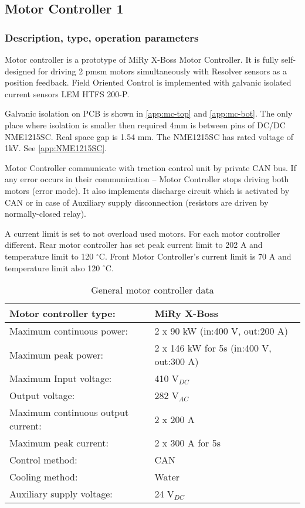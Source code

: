 \subsection{Motor Controller 1}

\subsubsection{Description, type, operation parameters}
Motor controller is a prototype of MiRy X-Boss Motor Controller. It is fully self-designed for driving 2 \gls{pmsm} motors simultaneously with Resolver sensors as a position feedback. Field Oriented Control is implemented with galvanic isolated current sensors LEM HTFS 200-P.

Galvanic isolation on PCB is shown in \ref{app:mc-top} and \ref{app:mc-bot}. The only place where isolation is smaller then required 4mm is between pins of DC/DC NME1215SC. Real space gap is 1.54 mm. The NME1215SC has rated voltage of 1kV. See \ref{app:NME1215SC}.

Motor Controller communicate with traction control unit by private CAN bus. If any error occurs in their communication – Motor Controller stops driving both motors (error mode). It also implements discharge circuit which is activated by CAN or in case of Auxiliary supply disconnection (resistors are driven by normally-closed relay).

A current limit is set to not overload used motors. For each motor controller different. Rear motor controller has set peak current limit to 202 A and temperature limit to 120 $^\circ$C. Front Motor Controller’s current limit is 70 A and temperature limit also 120 $^\circ$C.

\begin{table}[H]
	\centering
	\caption{General motor controller data}
	\begin{tabularx}{\textwidth}{|X|X|}\hline
		Motor controller type: & MiRy X-Boss \\[\TableSize]\hline
		Maximum continuous power: & 2 x 90 kW (in:400 V, out:200 A) \\[\TableSize]\hline
		Maximum peak power: & 2 x 146 kW for 5s (in:400 V, out:300 A) \\[\TableSize]\hline
		Maximum Input voltage: & 410 V$_{DC}$ \\[\TableSize]\hline
		Output voltage: & 282 V$_{AC}$ \\[\TableSize]\hline
		Maximum continuous output current: & 2 x 200 A \\[\TableSize]\hline
		Maximum peak current: & 2 x 300 A for 5s \\[\TableSize]\hline
		Control method: & CAN \\[\TableSize]\hline
		Cooling method: & Water \\[\TableSize]\hline
		Auxiliary supply voltage: & 24 V$_{DC}$ \\[\TableSize]\hline
	\end{tabularx}%
	\label{tab:MC:general}%
\end{table}%

